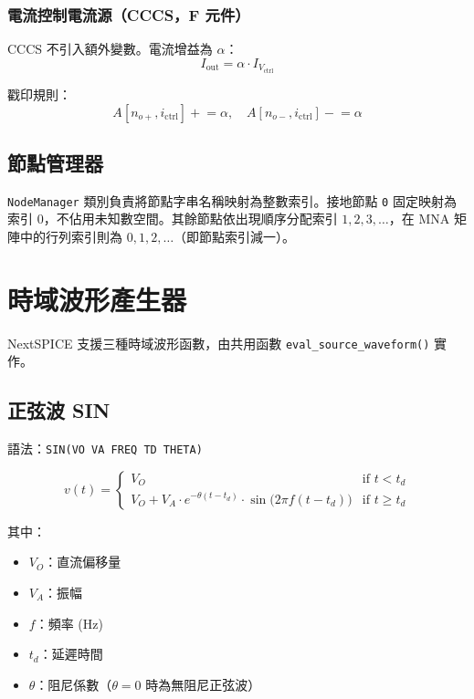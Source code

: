 \documentclass[12pt,a4paper]{article}
\begin{document}
\subsubsection{電流控制電流源（CCCS，F 元件）}

CCCS 不引入額外變數。電流增益為 $\alpha$：
\begin{equation}
I_{\text{out}} = \alpha \cdot I_{V_{\text{ctrl}}}
\end{equation}

戳印規則：
\begin{equation}
A[n_{o+}, i_{\text{ctrl}}] \mathrel{+}= \alpha, \quad A[n_{o-}, i_{\text{ctrl}}] \mathrel{-}= \alpha
\end{equation}

\subsection{節點管理器}

\texttt{NodeManager} 類別負責將節點字串名稱映射為整數索引。接地節點 \texttt{0} 固定映射為索引 0，不佔用未知數空間。其餘節點依出現順序分配索引 $1, 2, 3, \ldots$，在 MNA 矩陣中的行列索引則為 $0, 1, 2, \ldots$（即節點索引減一）。


\section{時域波形產生器}

NextSPICE 支援三種時域波形函數，由共用函數 \texttt{eval\_source\_waveform()} 實作。

\subsection{正弦波 SIN}

語法：\texttt{SIN(VO VA FREQ TD THETA)}

\begin{equation}
v(t) = \begin{cases}
V_O & \text{if } t < t_d \\
V_O + V_A \cdot e^{-\theta(t-t_d)} \cdot \sin\bigl(2\pi f(t-t_d)\bigr) & \text{if } t \geq t_d
\end{cases}
\end{equation}

\noindent 其中：
\begin{itemize}
  \item $V_O$：直流偏移量
  \item $V_A$：振幅
  \item $f$：頻率 (Hz)
  \item $t_d$：延遲時間
  \item $\theta$：阻尼係數（$\theta = 0$ 時為無阻尼正弦波）
\end{itemize}
\end{document}
